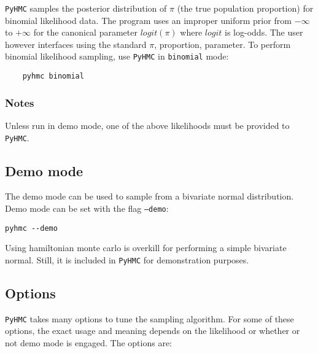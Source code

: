 \documentclass[10pt,letterpaper]{article}
\begin{document}
\texttt{PyHMC} samples the posterior distribution of $\pi$ (the true population
proportion) for binomial likelihood data.  The program uses an improper uniform
prior from $-\infty$ to $+\infty$ for the canonical parameter $logit(\pi)$
where $logit$ is log-odds.  The user however interfaces using the standard
$\pi$, proportion, parameter.  To perform binomial likelihood sampling, use
\texttt{PyHMC} in \texttt{binomial} mode:

\begin{verbatim}
	pyhmc binomial
\end{verbatim}


\subsubsection{Notes}
\label{ssub:notes}

Unless run in demo mode, one of the above likelihoods must be provided to
\texttt{PyHMC}.




\subsection{Demo mode}
\label{sub:demo_mode}

The demo mode can be used to sample from a bivariate normal distribution.  Demo
mode can be set with the flag \texttt{--demo}:

\begin{verbatim}
pyhmc --demo
\end{verbatim}

Using hamiltonian monte carlo is overkill for performing a simple bivariate
normal.  Still, it is included in \texttt{PyHMC} for demonstration purposes.


\subsection{Options}
\label{sub:options}

\texttt{PyHMC} takes many options to tune the sampling algorithm.  For some of
these options, the exact usage and meaning depends on the likelihood or whether
or not demo mode is engaged.  The options are:
\end{document}
